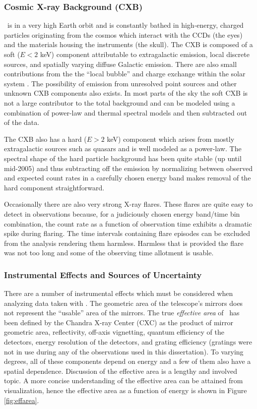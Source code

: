 \subsubsection{Cosmic X-ray Background (CXB)}

\chandra\ is in a very high Earth orbit and is constantly bathed in
high-energy, charged particles originating from the cosmos which
interact with the CCDs (the eyes) and the materials housing the
instruments (the skull). The CXB is composed of a soft ($E < 2$ keV)
component attributable to extragalactic emission, local discrete
sources, and spatially varying diffuse Galactic emission. There are
also small contributions from the the ``local bubble''
\citep{2004ASSL..309..103S} and charge exchange within the solar
system \citep{2004ApJ...607..596W}. The possibility of emission from
unresolved point sources and other unknown CXB components also
exists. In most parts of the sky the soft CXB is not a large
contributor to the total background and can be modeled using a
combination of power-law and thermal spectral models and then
subtracted out of the data.

The CXB also has a hard ($E > 2$ keV) component which arises from
mostly extragalactic sources such as quasars and is well modeled as a
power-law. The spectral shape of the hard particle background has been
quite stable (up until mid-2005) and thus subtracting off the emission
by normalizing between observed and expected count rates in a
carefully chosen energy band makes removal of the hard component
straightforward.

Occasionally there are also very strong X-ray flares. These flares are
quite easy to detect in observations because, for a judiciously chosen
energy band/time bin combination, the count rate as a function of
observation time exhibits a dramatic spike during flaring. The time
intervals containing flare episodes can be excluded from the analysis
rendering them harmless. Harmless that is provided the flare was not
too long and some of the observing time allotment is usable.

\subsubsection{Instrumental Effects and Sources of Uncertainty}

There are a number of instrumental effects which must be considered
when analyzing data taken with \chandra. The geometric area of the
telescope's mirrors does not represent the ``usable'' area of the
mirrors. The true {\it{effective area}} of \chandra\ has been defined
by the Chandra X-ray Center (CXC) as the product of mirror geometric
area, reflectivity, off-axis vignetting, quantum efficiency of the
detectors, energy resolution of the detectors, and grating efficiency
(gratings were not in use during any of the observations used in this
dissertation). To varying degrees, all of these components depend on
energy and a few of them also have a spatial dependence. Discussion of
the effective area is a lengthy and involved topic. A more concise
understanding of the effective area can be attained from
visualization, hence the effective area as a function of energy is
shown in Figure \ref{fig:effarea}.

